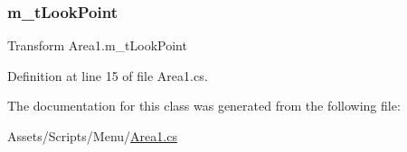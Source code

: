 \mbox{\label{class_area1_ae1cb617dc149937706a5d595ee200391}} 
\subsubsection{\texorpdfstring{m\+\_\+t\+Look\+Point}{m\_tLookPoint}}
{\footnotesize\ttfamily Transform Area1.\+m\+\_\+t\+Look\+Point}



Definition at line 15 of file Area1.\+cs.



The documentation for this class was generated from the following file\+:\begin{DoxyCompactItemize}
\item 
Assets/\+Scripts/\+Menu/\mbox{\hyperlink{_area1_8cs}{Area1.\+cs}}\end{DoxyCompactItemize}
